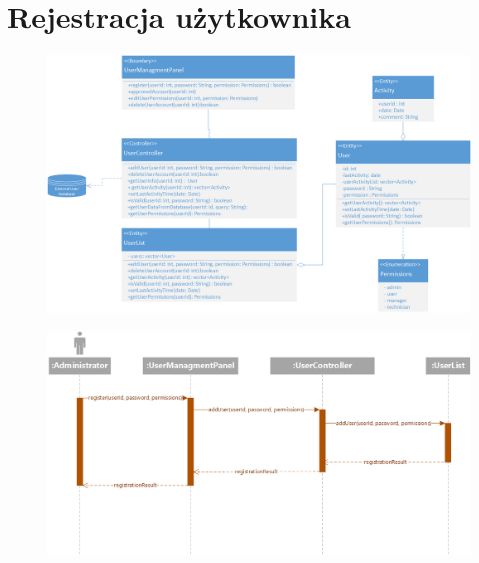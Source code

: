 \documentclass[11pt, a4paper, oneside]{report}
\begin{document}
\section{Rejestracja użytkownika}
\begin{figure}[H]
\centering
\includegraphics[scale=0.5]{rejestracja_class.png}
\end{figure}
\begin{figure}[H]
\centering
\includegraphics[scale=0.5]{rejestracja_sequence.png}
\end{figure}
\end{document}
